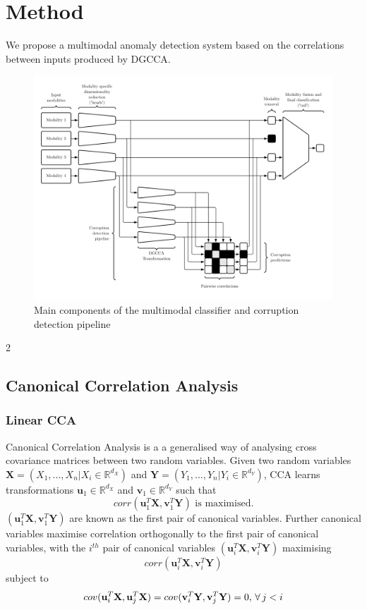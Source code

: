 \chapter{Method}

We propose a multimodal anomaly detection system based on the correlations between inputs produced by DGCCA.

\begin{figure}[H]
    \centering
    \includegraphics[width=\textwidth]{images/pipeline.png}
    \caption{Main components of the multimodal classifier and corruption detection pipeline}
    \label{fig:pipeline}
\end{figure}
2
\section{Canonical Correlation Analysis}
\subsection{Linear CCA}
Canonical Correlation Analysis \cite{CCA} is a a generalised way of analysing cross covariance matrices between two random variables. Given two random variables $\mathbf{X}=(X_1,...,X_n | X_i\in\mathbb{R}^{d_X})$ and $\mathbf{Y}=(Y_1,...,Y_n | Y_i\in\mathbb{R}^{d_Y})$, CCA learns transformations $\mathbf{u}_1\in\mathbb{R}^{d_X}$ and $\mathbf{v}_1\in\mathbb{R}^{d_Y}$ such that $$corr(\mathbf{u}_1^T\mathbf{X}, \mathbf{v}_1^T\mathbf{Y}) \textrm{ is maximised.}$$ $(\mathbf{u}_1^T\mathbf{X}, \mathbf{v}_1^T\mathbf{Y})$ are known as the first pair of canonical variables. Further canonical variables maximise correlation orthogonally to the first pair of canonical variables, with the $i^{th}$ pair of canonical variables $(\mathbf{u}_i^T\mathbf{X}, \mathbf{v}_i^T\mathbf{Y})$ maximising $$corr(\mathbf{u}_i^T\mathbf{X}, \mathbf{v}_i^T\mathbf{Y})$$ subject to $$cov(\mathbf{u}_i^T\mathbf{X}, \mathbf{u}_j^T\mathbf{X}) = cov(\mathbf{v}_i^T\mathbf{Y}, \mathbf{v}_j^T\mathbf{Y}) = 0,\thinspace  \forall \thinspace  j<i$$

